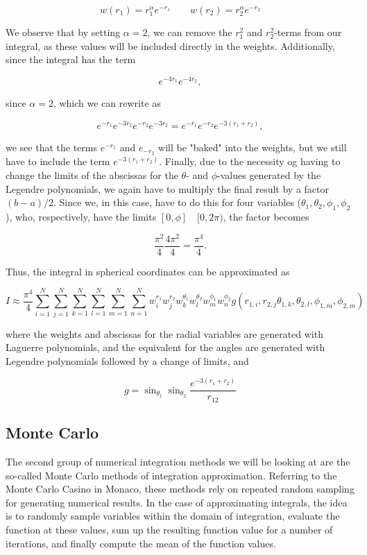 \documentclass[a4paper,10pt,english]{article}
\begin{document}
$$w(r_1) = r_1^{\alpha} e^{-r_1} \qquad w(r_2) = r_2^{\alpha} e^{-r_2}$$

We observe that by setting $\alpha = 2$, we can remove the $r_1^2$ and $r_2^2$-terms from our integral, as these values will be included directly in the weights. Additionally, since the integral has the term

$$e^{-4r_1}e^{-4r_2},$$

since $\alpha = 2$, which we can rewrite as

$$e^{-r_1}e^{-3r_2}e^{-r_2}e^{-3r_2} = e^{-r_1}e^{-r_2}e^{-3(r_1 + r_2)},$$

we see that the terms $e^{-r_1}$ and $e_{-r_2}$ will be "baked" into the weights, but we still have to include the term $e^{-3(r_1 + r_2)}$. Finally, due to the necessity og having to change the limits of the abscissas for the $\theta$- and $\phi$-values generated by the Legendre polynomials, we again have to multiply the final result by a factor $(b - a)/2$. Since we, in this case, have to do this for four variables ($\theta_1, \theta_2, \phi_1, \phi_2$), who, respectively, have the limits $[0, \phi] \quad [0, 2\pi )$, the factor becomes

$$\frac{\pi^2}{4} \frac{4\pi^2}{4} = \frac{\pi^4}{4}.$$

Thus, the integral in spherical coordinates can be approximated as



$$I \approx \frac{\pi^4}{4} \sum_{i = 1}^N \sum_{j = 1}^N \sum_{k = 1}^N \sum_{l = 1}^N \sum_{m= 1}^N \sum_{n = 1}^N w^{r_1}_i w^{r_2}_j w^{\theta_1}_k w^{\theta_2}_l w^{\phi_1}_m w^{\phi_2}_n g\left(r_{1,i}, r_{2,j} \theta_{1,k}, \theta_{2,l}, \phi_{1,m}, \phi_{2,m}\right)$$

where the weights and abscissas for the radial variables are generated with Laguerre polynomials, and the equivalent for the angles are generated with Legendre polynomials followed by a change of limits, and 

$$g = \sin_{\theta_1}\sin_{\theta_2}\frac{e^{-3(r_1 + r_2)}}{r_{12}}$$

\subsection{Monte Carlo} \label{sec:mc}

The second group of numerical integration methods we will be looking at are the so-called Monte Carlo methods of integration approximation. Referring to the Monte Carlo Casino in Monaco, these methods rely on repeated random sampling for generating numerical results. In the case of approximating integrals, the idea is to randomly sample variables within the domain of integration, evaluate the function at these values, sum up the resulting function value for a number of iterations, and finally compute the mean of the function values. 
\end{document}

